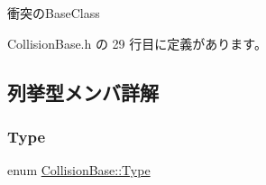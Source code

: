 衝突の\+Base\+Class 

 Collision\+Base.\+h の 29 行目に定義があります。



\subsection{列挙型メンバ詳解}
\mbox{\label{class_collision_base_a18dc0d5461742083ca12013fe9ff1a20}} 
\subsubsection{\texorpdfstring{Type}{Type}}
{\footnotesize\ttfamily enum \mbox{\hyperlink{class_collision_base_a18dc0d5461742083ca12013fe9ff1a20}{Collision\+Base\+::\+Type}}}

